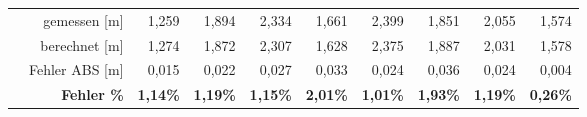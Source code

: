 \begin{table}[h]
\begin{tabular}{r|rrr|r|r|r|r|rrr}
\cline{2-11}    \multicolumn{1}{r}{} & \multicolumn{2}{r}{gemessen [m]} & \multicolumn{1}{r}{1,259} & \multicolumn{1}{r}{1,894} & \multicolumn{1}{r}{2,334} & \multicolumn{1}{r}{1,661} & \multicolumn{1}{r}{2,399} & 1,851 & 2,055 & 1,574 \\
    \multicolumn{1}{r}{} & \multicolumn{2}{r}{berechnet [m]} & \multicolumn{1}{r}{1,274} & \multicolumn{1}{r}{1,872} & \multicolumn{1}{r}{2,307} & \multicolumn{1}{r}{1,628} & \multicolumn{1}{r}{2,375} & 1,887 & 2,031 & 1,578 \\
    \multicolumn{1}{r}{} & \multicolumn{2}{r}{Fehler ABS [m]} & \multicolumn{1}{r}{0,015} & \multicolumn{1}{r}{0,022} & \multicolumn{1}{r}{0,027} & \multicolumn{1}{r}{0,033} & \multicolumn{1}{r}{0,024} & 0,036 & 0,024 & 0,004 \\
    \multicolumn{1}{r}{} & \multicolumn{2}{r}{\textbf{Fehler \%}} & \multicolumn{1}{r}{\textbf{1,14\%}} & \multicolumn{1}{r}{\textbf{1,19\%}} & \multicolumn{1}{r}{\textbf{1,15\%}} & \multicolumn{1}{r}{\textbf{2,01\%}} & \multicolumn{1}{r}{\textbf{1,01\%}} & \textbf{1,93\%} & \textbf{1,19\%} & \textbf{0,26\%} \\
    \end{tabular}%
\end{table}%
